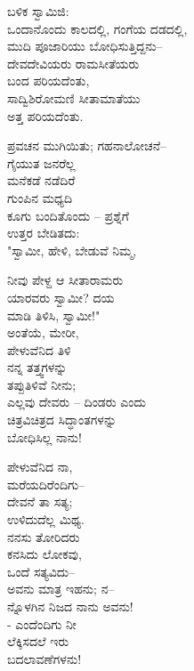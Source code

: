 \begin{myquote}
ಬಳಿಕ ಸ್ವಾಮಿಜಿ:\\ಒಂದಾನೊಂದು ಕಾಲದಲ್ಲಿ, ಗಂಗೆಯ ದಡದಲ್ಲಿ,\\ಮುದಿ ಪೂಜಾರಿಯು ಬೋಧಿಸುತ್ತಿದ್ದನು–\\ದೇವದೇವಿಯರು ರಾಮಸೀತೆಯರು\\ಬಂದ ಪರಿಯದೆಂತು,\\ಸಾದ್ವಿಶಿರೋಮಣಿ ಸೀತಾಮಾತೆಯು\\ಅತ್ತ ಪರಿಯದೆಂತು.
\end{myquote}

\begin{myquote}
ಪ್ರವಚನ ಮುಗಿಯಿತು; ಗಹನಾಲೋಚನೆ–\\ಗೈಯುತ ಜನರೆಲ್ಲ\\ಮನೆಕಡೆ ನಡೆದಿರೆ\\ಗುಂಪಿನ ಮಧ್ಯದಿ\\ಕೂಗು ಬಂದಿತೊಂದು – ಪ್ರಶ್ನೆಗೆ\\ಉತ್ತರ ಬೇಡಿತದು:\\"ಸ್ವಾಮೀ, ಹೇಳಿ, ಬೇಡುವೆ ನಿಮ್ಮ,
\end{myquote}

\begin{myquote}
ನೀವು ಪೇಳ್ದ ಆ ಸೀತಾರಾಮರು\\ಯಾರವರು ಸ್ವಾಮೀ? ದಯ\\ಮಾಡಿ ತಿಳಿಸಿ, ಸ್ವಾಮೀ!"\\ಅಂತೆಯೆ, ಮೇರೀ,\\ಪೇಳುವೆನಿದ ತಿಳಿ\\ನನ್ನ ತತ್ತ್ವಗಳನ್ನು\\ತಪ್ಪುತಿಳಿವೆ ನೀನು;\\ಎಲ್ಲವು ದೇವರು – ದಿಂಡರು ಎಂದು\\ಚಿತ್ರವಿಚಿತ್ರದ ಸಿದ್ಧಾಂತಗಳನ್ನು\\ಬೋಧಿಸಿಲ್ಲ ನಾನು!
\end{myquote}

\begin{myquote}
ಪೇಳುವೆನಿದ ನಾ,\\ಮರೆಯದಿರೆಂದಿಗು–\\ದೇವನೆ ತಾ ಸತ್ಯ;\\ಉಳಿದುದೆಲ್ಲ ಮಿಥ್ಯ.\\ನನಸು ತೋರಿದರು\\ಕನಸಿದು ಲೋಕವು,\\ಒಂದೆ ಸತ್ಯವಿದು–\\ಅವನು ಮಾತ್ರ ಇಹನು; ನ–\\ನ್ನೊಳಗಿನ ನಿಜದ ನಾನು ಅವನು!\\- ಎಂದೆಂದಿಗು ನೀ\\ಲೆಕ್ಕಿಸದಲೆ ಇರು\\ಬದಲಾವಣೆಗಳನು!
\end{myquote}

